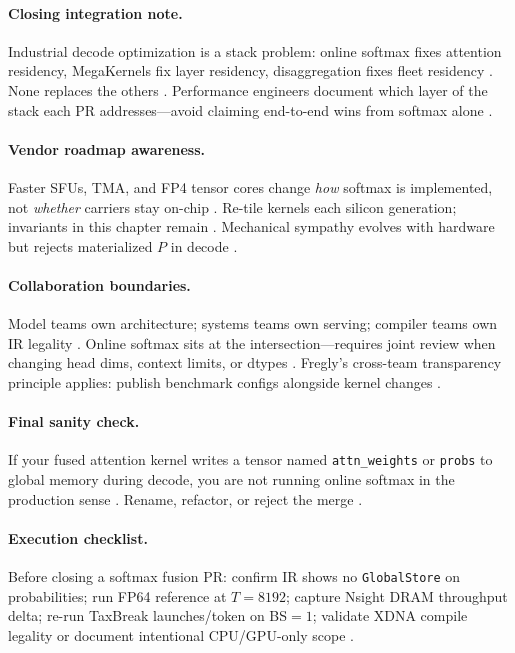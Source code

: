 \paragraph{Closing integration note.} Industrial decode optimization is a stack problem: online softmax fixes attention residency, MegaKernels fix layer residency, disaggregation fixes fleet residency \citep{patel2025llminference,kwon2023vllm,taxbreak2026}. None replaces the others \citep{memoryfloor2026,liu2024deepseekv3}. Performance engineers document which layer of the stack each PR addresses---avoid claiming end-to-end wins from softmax alone \citep{yirage2026,dlbook}.

\paragraph{Vendor roadmap awareness.} Faster SFUs, TMA, and FP4 tensor cores change \emph{how} softmax is implemented, not \emph{whether} carriers stay on-chip \citep{nvidia2022hopper,semianalysis2024tma,patel2025llminference}. Re-tile kernels each silicon generation; invariants in this chapter remain \citep{dao2022flashattention,chen2020compilerbasedhardw}. Mechanical sympathy evolves with hardware but rejects materialized $P$ in decode \citep{memoryfloor2026,taxbreak2026}.

\paragraph{Collaboration boundaries.} Model teams own architecture; systems teams own serving; compiler teams own IR legality \citep{yirage2026,patel2025llminference}. Online softmax sits at the intersection---requires joint review when changing head dims, context limits, or dtypes \citep{liu2024deepseekv3,kwon2023vllm}. Fregly's cross-team transparency principle applies: publish benchmark configs alongside kernel changes \citep{taxbreak2026,memoryfloor2026}.

\paragraph{Final sanity check.} If your fused attention kernel writes a tensor named \texttt{attn\_weights} or \texttt{probs} to global memory during decode, you are not running online softmax in the production sense \citep{dao2022flashattention,memoryfloor2026}. Rename, refactor, or reject the merge \citep{yirage2026,chen2020compilerbasedhardw,taxbreak2026}.


\paragraph{Execution checklist.} Before closing a softmax fusion PR: confirm IR shows no \texttt{GlobalStore} on probabilities; run FP64 reference at $T=8192$; capture Nsight DRAM throughput delta; re-run TaxBreak launches/token on BS${=}1$; validate XDNA compile legality or document intentional CPU/GPU-only scope \citep{yirage2026,taxbreak2026,memoryfloor2026,amd2024aie,patel2025llminference,dao2022flashattention,chen2020compilerbasedhardw,semianalysis2024tma,dlbook,kwon2023vllm,nvidia2024cudagraphs,liu2024deepseekv3,dao2023flashdecoding}.

